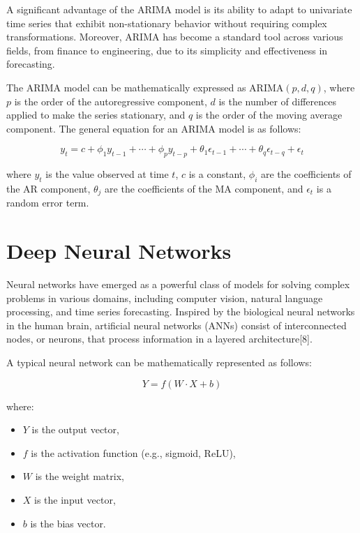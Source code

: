 \documentclass[a4paper,12pt]{article}
\begin{document}
A significant advantage of the ARIMA model is its ability to adapt to univariate time series that exhibit non-stationary behavior without requiring complex transformations. Moreover, ARIMA has become a standard tool across various fields, from finance to engineering, due to its simplicity and effectiveness in forecasting.

The ARIMA model can be mathematically expressed as ARIMA$(p,d,q)$, where $p$ is the order of the autoregressive component, $d$ is the number of differences applied to make the series stationary, and $q$ is the order of the moving average component. The general equation for an ARIMA model is as follows:

\[
y_t = c + \phi_1 y_{t-1} + \cdots + \phi_p y_{t-p} + \theta_1 \epsilon_{t-1} + \cdots + \theta_q \epsilon_{t-q} + \epsilon_t
\]

where $y_t$ is the value observed at time $t$, $c$ is a constant, $\phi_i$ are the coefficients of the AR component, $\theta_j$ are the coefficients of the MA component, and $\epsilon_t$ is a random error term.

\section{Deep Neural Networks}

Neural networks have emerged as a powerful class of models for solving complex problems in various domains, including computer vision, natural language processing, and time series forecasting. Inspired by the biological neural networks in the human brain, artificial neural networks (ANNs) consist of interconnected nodes, or neurons, that process information in a layered architecture[8].

A typical neural network can be mathematically represented as follows:

\begin{equation}
Y = f(W \cdot X + b)
\end{equation}

where:
\begin{itemize}
    \item \(Y\) is the output vector,
    \item \(f\) is the activation function (e.g., sigmoid, ReLU),
    \item \(W\) is the weight matrix,
    \item \(X\) is the input vector,
    \item \(b\) is the bias vector.
\end{itemize}
\end{document}
